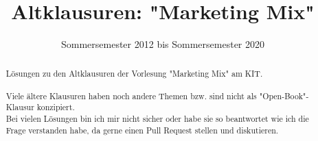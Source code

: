 \documentclass[]{article}
\title{Altklausuren: "Marketing Mix"}
\date{Sommersemester 2012 bis Sommersemester 2020}
\begin{document}
\maketitle

\begin{abstract}
Lösungen zu den Altklausuren der Vorlesung "Marketing Mix" am KIT. \\
\ \\
Viele ältere Klausuren haben noch andere Themen bzw. sind nicht als "Open-Book"-Klausur konzipiert. \\
Bei vielen Lösungen bin ich mir nicht sicher oder habe sie so beantwortet wie ich die Frage verstanden habe, da gerne einen Pull Request stellen und diskutieren. \\
\end{abstract}
\newpage









\end{document}
